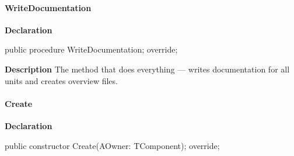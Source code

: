 \documentclass{report}
\newif\ifpdf
\begin{document}
\paragraph*{WriteDocumentation}\hspace*{\fill}

\label{PasDoc_GenLatex.TTexDocGenerator-WriteDocumentation}
\begin{list}{}{
\setlength{\itemindent}{0cm}
\setlength{\listparindent}{0cm}
\setlength{\leftmargin}{\evensidemargin}
\addtolength{\leftmargin}{\tmplength}
\settowidth{\labelsep}{X}
\addtolength{\leftmargin}{\labelsep}
\setlength{\labelwidth}{\tmplength}
}
\item[\textbf{Declaration}\hfill]
\ifpdf
\begin{flushleft}
\fi
\begin{ttfamily}
public procedure WriteDocumentation; override;\end{ttfamily}

\ifpdf
\end{flushleft}
\fi

\par
\item[\textbf{Description}]
The method that does everything --- writes documentation for all units and creates overview files.

\end{list}
\paragraph*{Create}\hspace*{\fill}

\label{PasDoc_GenLatex.TTexDocGenerator-Create}
\begin{list}{}{
\setlength{\itemindent}{0cm}
\setlength{\listparindent}{0cm}
\setlength{\leftmargin}{\evensidemargin}
\addtolength{\leftmargin}{\tmplength}
\settowidth{\labelsep}{X}
\addtolength{\leftmargin}{\labelsep}
\setlength{\labelwidth}{\tmplength}
}
\item[\textbf{Declaration}\hfill]
\ifpdf
\begin{flushleft}
\fi
\begin{ttfamily}
public constructor Create(AOwner: TComponent); override;\end{ttfamily}

\ifpdf
\end{flushleft}
\fi

\end{list}
\end{document}
